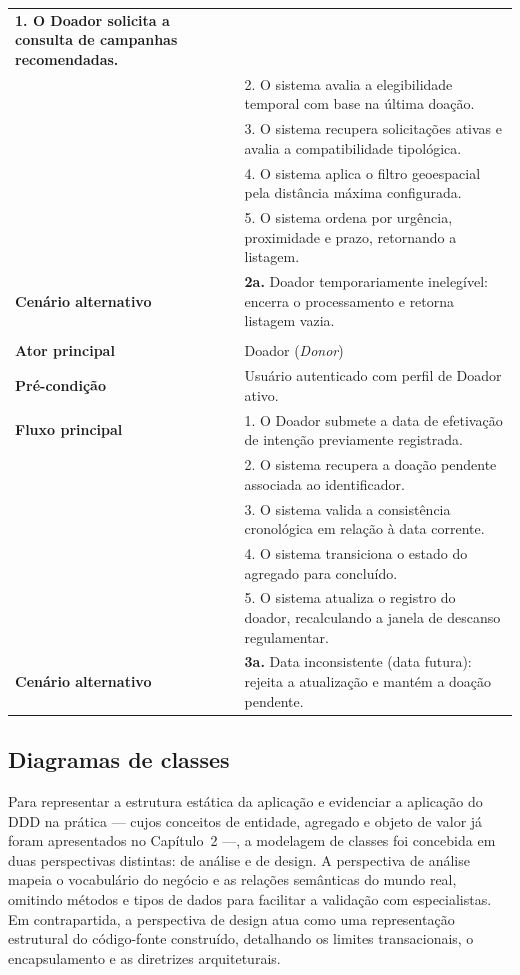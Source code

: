 \begin{table}[H]
\begin{tabularx}{\textwidth}{>{\bfseries}p{3.3cm} X}
    1. O Doador solicita a consulta de campanhas recomendadas.\\
    & 2. O sistema avalia a elegibilidade temporal com base na última doação.\\
    & 3. O sistema recupera solicitações ativas e avalia a compatibilidade tipológica.\\
    & 4. O sistema aplica o filtro geoespacial pela distância máxima configurada.\\
    & 5. O sistema ordena por urgência, proximidade e prazo, retornando a listagem. \\
    Cenário alternativo & \textbf{2a.} Doador temporariamente inelegível: encerra o processamento e retorna listagem vazia. \\
    \midrule
    \multicolumn{2}{l}{\textbf{UC12: Completar doação pendente}} \\
    \midrule
    Ator principal & Doador (\textit{Donor}) \\
    Pré-condição & Usuário autenticado com perfil de Doador ativo. \\
    Fluxo principal & 
    1. O Doador submete a data de efetivação de intenção previamente registrada.\\
    & 2. O sistema recupera a doação pendente associada ao identificador.\\
    & 3. O sistema valida a consistência cronológica em relação à data corrente.\\
    & 4. O sistema transiciona o estado do agregado para concluído.\\
    & 5. O sistema atualiza o registro do doador, recalculando a janela de descanso regulamentar. \\
    Cenário alternativo & \textbf{3a.} Data inconsistente (data futura): rejeita a atualização e mantém a doação pendente. \\
    \bottomrule
  \end{tabularx}
\end{table}

\subsection{Diagramas de classes}

Para representar a estrutura estática da aplicação e evidenciar a aplicação do DDD na prática --- cujos conceitos de entidade, agregado e objeto de valor já foram apresentados no Capítulo~2 ---, a modelagem de classes foi concebida em duas perspectivas distintas: de análise e de design. A perspectiva de análise mapeia o vocabulário do negócio e as relações semânticas do mundo real, omitindo métodos e tipos de dados para facilitar a validação com especialistas. Em contrapartida, a perspectiva de design atua como uma representação estrutural do código-fonte construído, detalhando os limites transacionais, o encapsulamento e as diretrizes arquiteturais.

